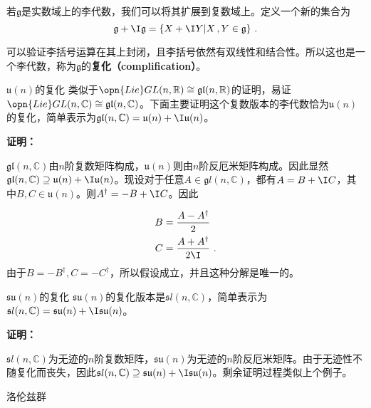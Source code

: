 

\begin{definition}{}
若$\mathfrak g$是实数域上的李代数，我们可以将其扩展到复数域上。定义一个新的集合为
\begin{equation}
\mathfrak g+\I \mathfrak g=\{X+\I Y|X\,,Y\in\mathfrak g\}~.
\end{equation}
\end{definition}
可以验证李括号运算在其上封闭，且李括号依然有双线性和结合性。所以这也是一个李代数，称为$\mathfrak g$的\textbf{复化（complification）}。
\begin{example}{$\mathfrak u(n)$的复化}
类似于$\opn{Lie}GL(n,\mathbb R)\cong \mathfrak{gl}(n,\mathbb R)$的证明，易证$\opn{Lie}GL(n,\mathbb C)\cong \mathfrak{gl}(n,\mathbb C)$。下面主要证明这个复数版本的李代数恰为$\mathfrak u(n)$的复化，简单表示为$\mathfrak{gl}(n,\mathbb C)=\mathfrak u(n)+\I \mathfrak u(n)$。

\textbf{证明：}

$\mathfrak{gl}(n,\mathbb C)$由$n$阶复数矩阵构成，$\mathfrak u(n)$则由$n$阶反厄米矩阵构成。因此显然$\mathfrak{gl}(n,\mathbb C)\supseteq \mathfrak u(n)+\I \mathfrak u(n)$。现设对于任意$A\in \mathfrak gl(n,\mathbb C)$，都有$A=B+\I C$，其中$B,C\in \mathfrak u(n)$。则$A^{\dagger}=-B+\I C$。因此

\begin{equation}
\begin{aligned}
B&=\frac{A-A^{\dagger}}{2}\\
C&= \frac{A+A^{\dagger}}{2\I}~.
\end{aligned}
\end{equation}
由于$B=-B^{\dagger},C=-C^{\dagger}$，所以假设成立，并且这种分解是唯一的。

\end{example}
\begin{example}{$\mathfrak {su}(n)$的复化}
$\mathfrak {su}(n)$的复化版本是$\mathfrak sl(n,\mathbb C)$，简单表示为$\mathfrak sl(n,\mathbb C)=\mathfrak {su}(n)+\I \mathfrak {su}(n)$。

\textbf{证明：}

$\mathfrak sl(n,\mathbb C)$为无迹的$n$阶复数矩阵，$\mathfrak {su}(n)$为无迹的$n$阶反厄米矩阵。由于无迹性不随复化而丧失，因此$\mathfrak sl(n,\mathbb C)\supseteq \mathfrak {su}(n)+\I \mathfrak {su}(n)$。剩余证明过程类似上个例子。
\end{example}
\begin{example}{洛伦兹群}

\end{example}